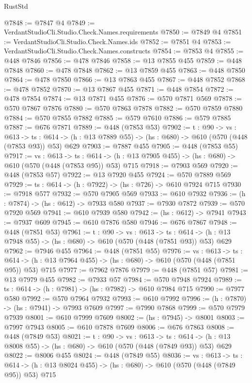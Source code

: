 \begin{lexlean}{RustStd}
\begin{coremodule}
@7848 := @7847 @4
@7849 := VerdantStudioCli.Studio.Check.Names.requirements
@7850 := @7849 @4
@7851 := VerdantStudioCli.Studio.Check.Names.ids
@7852 := @7851 @4
@7853 := VerdantStudioCli.Studio.Check.Names.constructs
@7854 := @7853 @4
@7855 := @448 @7846
@7856 := @478 @7846
@7858 := @13 @7855 @455
@7859 := @448 @7848
@7860 := @478 @7848
@7862 := @13 @7859 @455
@7863 := @448 @7850
@7864 := @478 @7850
@7866 := @13 @7863 @455
@7867 := @448 @7852
@7868 := @478 @7852
@7870 := @13 @7867 @455
@7871 := @448 @7854
@7872 := @478 @7854
@7874 := @13 @7871 @455
@7876 := @570 @7871 @569
@7878 := @570 @7867 @7876
@7880 := @570 @7863 @7878
@7882 := @570 @7859 @7880
@7884 := @570 @7855 @7882
@7885 := @579 @7610
@7886 := @579 @7885
@7887 := @676 @7871
@7889 := @448 (@7853 @53)
@7902 := {t : @90} ->
  {vs : @613} ->
  {ts : @614} -> (h : @13 @7889 @55) -> (hs : @680) -> @610 (@570 (@448 (@7853 @93)) @53) @629
@7903 := @7887 @455
@7905 := @448 (@7853 @55)
@7917 := {vs : @613} ->
  {ts : @614} -> (h : @13 @7905 @455) -> (hs : @680) -> @610 (@570 (@448 (@7853 @95)) @53) @715
@7918 := @7903 @569
@7920 := @448 (@7853 @57)
@7922 := @13 @7920 @455
@7924 := @570 @7889 @569
@7929 := {ts : @614} -> (h : @7922) -> (hs : @726) -> @610 @7924 @715
@7930 := @7918 @577
@7932 := @570 @7905 @569
@7933 := @610 @7932
@7936 := (h : @7874) -> (hs : @612) -> @7933 @580
@7937 := @7930 @7872
@7939 := @570 @7920 @569
@7941 := @610 @7939 @580
@7942 := (hs : @612) -> @7941
@7943 := @7937 @609
@7945 := @610 @7876 @580
@7946 := @676 @7867
@7948 := @448 (@7851 @53)
@7961 := {t : @90} ->
  {vs : @613} ->
  {ts : @614} -> (h : @13 @7948 @55) -> (hs : @680) -> @610 (@570 (@448 (@7851 @93)) @53) @629
@7962 := @7946 @455
@7964 := @448 (@7851 @55)
@7976 := {vs : @613} ->
  {ts : @614} -> (h : @13 @7964 @455) -> (hs : @680) -> @610 (@570 (@448 (@7851 @95)) @53) @715
@7977 := @7962 @7876
@7979 := @448 (@7851 @57)
@7981 := @13 @7979 @455
@7982 := @7933 @57
@7984 := @570 @7948 @7924
@7989 := {ts : @614} -> (h : @7981) -> (hs : @7982) -> @610 @7984 @715
@7990 := @7977 @580
@7992 := @570 @7964 @7932
@7993 := @610 @7992
@7996 := (h : @7870) -> (hs : @7941) -> @7993 @7609
@7997 := @7990 @7868
@7999 := @570 @7979 @7939
@8001 := @610 @7999 @7609
@8002 := (hs : @7945) -> @8001
@8003 := @7997 @7943
@8005 := @610 @7878 @7609
@8006 := @676 @7863
@8008 := @448 (@7849 @53)
@8021 := {t : @90} ->
  {vs : @613} ->
  {ts : @614} -> (h : @13 @8008 @55) -> (hs : @680) -> @610 (@570 (@448 (@7849 @93)) @53) @629
@8022 := @8006 @455
@8024 := @448 (@7849 @55)
@8036 := {vs : @613} ->
  {ts : @614} -> (h : @13 @8024 @455) -> (hs : @680) -> @610 (@570 (@448 (@7849 @95)) @53) @715

\end{coremodule}
\end{lexlean}
